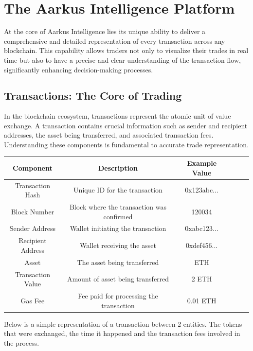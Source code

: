 \documentclass{article}
\begin{document}
\section{The Aarkus Intelligence Platform}
At the core of Aarkus Intelligence lies its unique ability to deliver a comprehensive and detailed representation of every transaction across any blockchain. This capability allows traders not only to visualize their trades in real time but also to have a precise and clear understanding of the transaction flow, significantly enhancing decision-making processes.

\subsection{Transactions: The Core of Trading}
In the blockchain ecosystem, transactions represent the atomic unit of value exchange. A transaction contains crucial information such as sender and recipient addresses, the asset being transferred, and associated transaction fees. Understanding these components is fundamental to accurate trade representation.

\begin{longtable}{|c|c|c|c|c|c|}
\hline
\textbf{Component} & \textbf{Description} & \textbf{Example Value} \\
\hline
Transaction Hash & Unique ID for the transaction & 0x123abc... \\
\hline
Block Number & Block where the transaction was confirmed & 120034 \\
\hline
Sender Address & Wallet initiating the transaction & 0xabc123... \\
\hline
Recipient Address & Wallet receiving the asset & 0xdef456... \\
\hline
Asset & The asset being transferred & ETH \\
\hline
Transaction Value & Amount of asset being transferred & 2 ETH \\
\hline
Gas Fee & Fee paid for processing the transaction & 0.01 ETH \\
\hline
\end{longtable}

Below is a simple representation of a transaction between 2 entities. The tokens that were exchanged, the time it happened and the transaction fees involved in the process.
\end{document}
